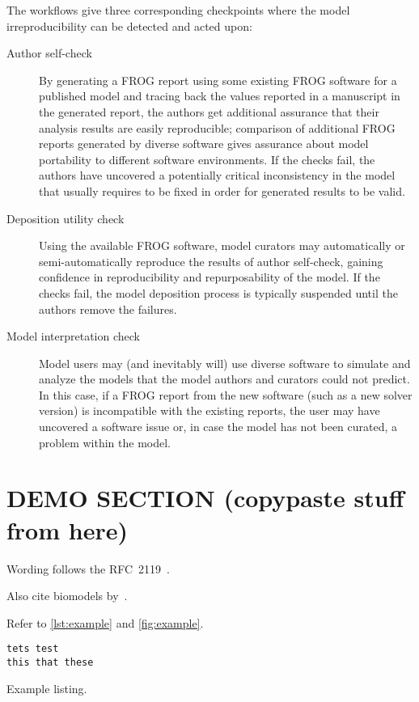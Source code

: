 The workflows give three corresponding checkpoints where the model irreproducibility can be detected and acted upon:
\begin{description}
\item[Author self-check] By generating a FROG report using some existing FROG software for a published model and tracing back the values reported in a manuscript in the generated report, the authors get additional assurance that their analysis results are easily reproducible; comparison of additional FROG reports generated by diverse software gives assurance about model portability to different software environments.
If the checks fail, the authors have uncovered a potentially critical inconsistency in the model that usually requires to be fixed in order for generated results to be valid.
\item[Deposition utility check] Using the available FROG software, model curators may automatically or semi-automatically reproduce the results of author self-check, gaining confidence in reproducibility and repurposability of the model.
If the checks fail, the model deposition process is typically suspended until the authors remove the failures.
\item[Model interpretation check] Model users may (and inevitably will) use diverse software to simulate and analyze the models that the model authors and curators could not predict.
In this case, if a FROG report from the new software (such as a new solver version) is incompatible with the existing reports, the user may have uncovered a software issue or, in case the model has not been curated, a problem within the model.
\end{description}

\iffalse
\section{DEMO SECTION (copypaste stuff from here)}

Wording follows the RFC~2119~\cite{rfc2119}.

Also cite biomodels by~\citeauthor{malik2020biomodels}.

Refer to \cref{lst:example} and \cref{fig:example}.

\begin{listing}
\begin{lstlisting}
tets test
this that these
\end{lstlisting}
\caption[Example]{Example listing.}
\label{lst:example}
\end{listing}

